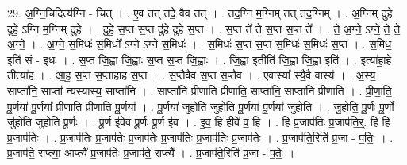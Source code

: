 \documentclass[17pt]{extarticle}
\begin{document}
29. अ॒ग्नि॒चिदित्य॑ग्नि - चित् । . ए॒व तत् तदे॒ वैव तत् । . तद॒ग्नि म॒ग्निम् तत् तद॒ग्निम् । . अ॒ग्निम् दु॑हे दुहे॒ ऽग्नि म॒ग्निम् दु॑हे । . दु॒हे॒ स॒प्त स॒प्त दु॑हे दुहे स॒प्त । . स॒प्त ते॑ ते स॒प्त स॒प्त ते᳚ । . ते॒ अ॒ग्ने॒ ऽग्ने॒ ते॒ ते॒ अ॒ग्ने॒ । . अ॒ग्ने॒ स॒मिधः॑ स॒मिधो᳚ ऽग्ने ऽग्ने स॒मिधः॑ । . स॒मिधः॑ स॒प्त स॒प्त स॒मिधः॑ स॒मिधः॑ स॒प्त । . स॒मिध॒ इति॑ सं - इधः॑ । . स॒प्त जि॒ह्वा जि॒ह्वाः स॒प्त स॒प्त जि॒ह्वाः । . जि॒ह्वा इतीति॑ जि॒ह्वा जि॒ह्वा इति॑ । . इत्या॑हा॒हे तीत्या॑ह । . आ॒ह॒ स॒प्त स॒प्ताहा॑ह स॒प्त । . स॒प्तैवैव स॒प्त स॒प्तैव । . ए॒वास्या᳚ स्यै॒वै वास्य॑ । . अ॒स्य॒ साप्ता॑नि॒ साप्ता᳚ न्यस्यास्य॒ साप्ता॑नि । . साप्ता॑नि प्रीणाति प्रीणाति॒ साप्ता॑नि॒ साप्ता॑नि प्रीणाति । . प्री॒णा॒ति॒ पू॒र्णया॑ पू॒र्णया᳚ प्रीणाति प्रीणाति पू॒र्णया᳚ । . पू॒र्णया॑ जुहोति जुहोति पू॒र्णया॑ पू॒र्णया॑ जुहोति । . जु॒हो॒ति॒ पू॒र्णः पू॒र्णो जु॑होति जुहोति पू॒र्णः । . पू॒र्ण इ॑वेव पू॒र्णः पू॒र्ण इ॑व । . इ॒व॒ हि हीवे॑ व॒ हि । . हि प्र॒जाप॑तिः प्र॒जाप॑ति॒र्॒. हि हि प्र॒जाप॑तिः । . प्र॒जाप॑तिः प्र॒जाप॑तेः प्र॒जाप॑तेः प्र॒जाप॑तिः प्र॒जाप॑तिः प्र॒जाप॑तेः । . प्र॒जाप॑ति॒रिति॑ प्र॒जा - प॒तिः॒ । . प्र॒जाप॑ते॒ राप्त्या॒ आप्त्यै᳚ प्र॒जाप॑तेः प्र॒जाप॑ते॒ राप्त्यै᳚ । . प्र॒जाप॑ते॒रिति॑ प्र॒जा - प॒तेः॒ । \newline
\end{document}

